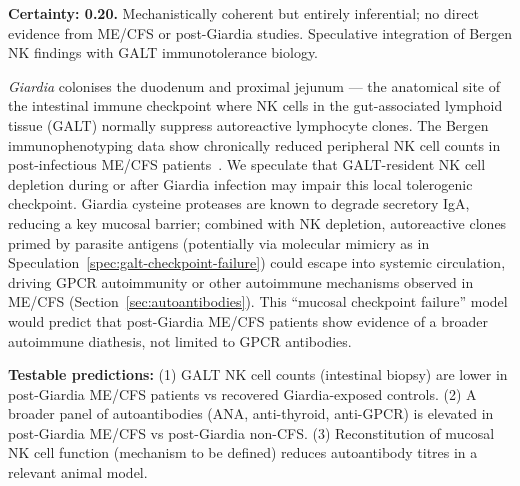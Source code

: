 \begin{speculation}
\label{spec:galt-checkpoint-failure}
\textbf{Certainty: 0.20.} Mechanistically coherent but entirely inferential; no direct evidence from ME/CFS or post-Giardia studies. Speculative integration of Bergen NK findings with GALT immunotolerance biology.

\emph{Giardia} colonises the duodenum and proximal jejunum --- the anatomical site of the intestinal immune checkpoint where NK cells in the gut-associated lymphoid tissue (GALT) normally suppress autoreactive lymphocyte clones. The Bergen immunophenotyping data show chronically reduced peripheral NK cell counts in post-infectious ME/CFS patients~\cite{Hanevik2012immunophenotype}. We speculate that GALT-resident NK cell depletion during or after Giardia infection may impair this local tolerogenic checkpoint. Giardia cysteine proteases are known to degrade secretory IgA, reducing a key mucosal barrier; combined with NK depletion, autoreactive clones primed by parasite antigens (potentially via molecular mimicry as in Speculation~\ref{spec:galt-checkpoint-failure}) could escape into systemic circulation, driving GPCR autoimmunity or other autoimmune mechanisms observed in ME/CFS (Section~\ref{sec:autoantibodies}). This ``mucosal checkpoint failure'' model would predict that post-Giardia ME/CFS patients show evidence of a broader autoimmune diathesis, not limited to GPCR antibodies.

\textbf{Testable predictions:} (1) GALT NK cell counts (intestinal biopsy) are lower in post-Giardia ME/CFS patients vs recovered Giardia-exposed controls. (2) A broader panel of autoantibodies (ANA, anti-thyroid, anti-GPCR) is elevated in post-Giardia ME/CFS vs post-Giardia non-CFS. (3) Reconstitution of mucosal NK cell function (mechanism to be defined) reduces autoantibody titres in a relevant animal model.
\end{speculation}

